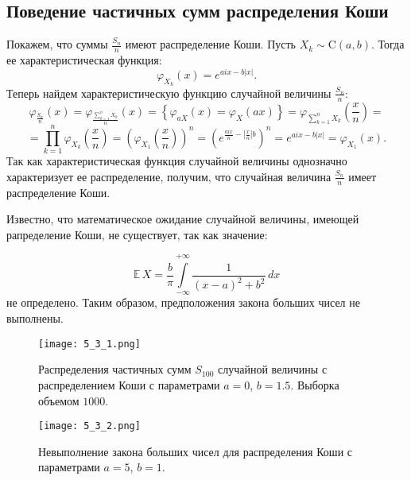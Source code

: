 \documentclass[a4paper, 11pt]{article}
\theoremstyle{def}
\theoremstyle{th}
\theoremstyle{rem}
\newcommand{\E}{\mathbb{E}}
\begin{document}
\subsection{Поведение частичных сумм распределения Коши}
Покажем, что суммы $\displaystyle\frac{S_n}{n}$ имеют распределение Коши.
Пусть $X_k \sim \mbox{C}(a, b)$. Тогда ее характеристическая функция:
$$
\varphi_X_k(x) = e^{aix - b|x|}.
$$
Теперь найдем характеристическую функцию случайной величины $\displaystyle\frac{S_n}{n}$:
$$
\displaystyle
\varphi_\frac{S_n}{n}(x) = \varphi_\frac{\sum\limits_{k=1}^n X_k}{n}(x) = \left\{\varphi_{aX}(x) = \varphi_X(ax)\right\} = \varphi_{\sum\limits_{k=1}^n X_k}\left(\frac{x}{n}\right) = 
$$
$$
\displaystyle
= \prod\limits_{k=1}^n\varphi_{X_k}\left(\frac{x}{n}\right) = \left(\varphi_{X_1}\left(\frac{x}{n}\right)\right)^n = \left(e^{\frac{aix}{n}-|\frac{x}{n}|b}\right)^n = e^{aix - b|x|} = \varphi_{X_1}(x).
$$
Так как характеристическая функция случайной величины однозначно характеризует ее распределение, получим, что случайная величина $\displaystyle\frac{S_n}{n}$ имеет распределение Коши.

Известно, что математическое ожидание случайной величины, имеющей рапределение Коши, не существует, так как значение:

$$
        \E\,X =
        \frac{b}{\pi}
        \int\limits_{-\infty}^{+\infty} \frac{1}{(x - a)^2 + b^2}\,dx
$$
не определено. Таким образом, предположения закона больших чисел не выполнены.
\begin{figure}[H]
        \noindent
        \centering
        {
                \texttt{[image: 5\_3\_1.png]}
        }
        \caption{Распределения частичных сумм $S_{100}$ случайной величины с распределением Коши с параметрами $a = 0$, $b = 1.5$. Выборка объемом $1000$.}
\end{figure}
\begin{figure}[H]
        \noindent
        \centering
        {
                \texttt{[image: 5\_3\_2.png]}
        }
        \caption{Невыполнение закона больших чисел для распределения Коши с параметрами $a = 5$, $b = 1$.}
\end{figure}
\end{document}
